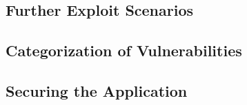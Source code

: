 \documentclass[a4paper,10pt]{article}
\begin{document}
\subsection{Further Exploit Scenarios}
\subsection{Categorization of Vulnerabilities}
\subsection{Securing the Application}

\begin{comment}
Setup: Bridged adapter, Boot from USB stick, mount disks read-only. Get IP by 'ip addr'.

~/.bash_history
/var/log/auth.log

/root/.mysql_history
/root/.bash_history
.lesshst?

url/uploads/shell.php (password in /var/www/uploads/shell.php)
url/login.php

PermitRootLogin yes in sshd_config
\end{comment}
\end{document}
